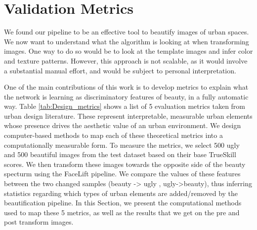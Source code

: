 \section{Validation Metrics}
We found our pipeline to be an effective tool to beautify images of urban spaces. We now want to understand what the algorithm is looking at when transforming images. One way to do so would be to look at the template images and infer color and texture patterns. However, this approach is not scalable, as it would involve a substantial manual effort, and would be subject to personal interpretation. 
 
%
One of the main contributions of this work is to develop metrics%
to explain what the network is learning %
as discriminatory features of beauty, in a fully automatic way. %
Table \ref{tab:Design_metrics} shows a list of 5 evaluation metrics%
taken from urban design literature\cite{ewing2013measuring,alexander1977pattern}. These represent interpretable, measurable urban elements whose presence drives the aesthetic value of an urban environment. %
We design computer-based methods to map each of these theoretical metrics into a computationally measurable form. 
To measure the metrics, we select 500 ugly and 500 beautiful images from the test dataset based on their base TrueSkill scores. We then transform these images towards the opposite side of the beauty specturm using the FaceLift pipeline. 
We compare the values of these features between the two changed samples (beauty -> ugly , ugly->beauty), thus inferring statistics regarding which types of urban elements are added/removed by the beautification pipeline.
In this Section, we present the computational methods used to map these 5 metrics, as well as the results that we get on the pre and post transform images. 


